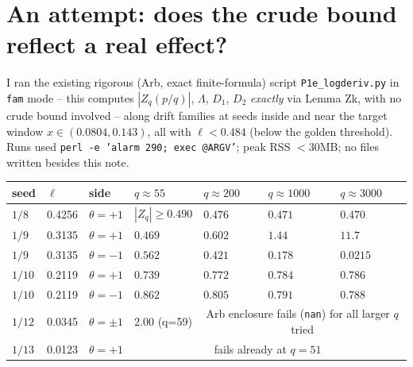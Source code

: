 \documentclass[11pt]{article}
\theoremstyle{remark}\newtheorem{remark}[theorem]{Remark}
\begin{document}
\section{An attempt: does the crude bound reflect a real effect?}\label{sec:attempt}
I ran the existing rigorous (Arb, exact finite-formula) script \texttt{P1e\_logderiv.py} in \texttt{fam} mode -- this computes $|Z_q(p/q)|$, $\Lambda$, $D_1$, $D_2$ \emph{exactly} via Lemma Zk, with no crude bound involved -- along drift families at seeds inside and near the target window $x\in(0.0804,0.143)$, all with $\ell<0.484$ (below the golden threshold). Runs used \texttt{perl -e 'alarm 290; exec @ARGV'}; peak RSS $<30$MB; no files written besides this note.

\begin{center}\small\begin{tabular}{lllllll}\toprule
seed & $\ell$ & side & $q\approx55$ & $q\approx200$ & $q\approx1000$ & $q\approx3000$\\\midrule
$1/8$ & 0.4256 & $\theta=+1$ & $|Z_q|\ge0.490$ & $0.476$ & $0.471$ & $0.470$\\
$1/9$ & 0.3135 & $\theta=+1$ & $0.469$ & $0.602$ & $1.44$ & $11.7$\\
$1/9$ & 0.3135 & $\theta=-1$ & $0.562$ & $0.421$ & $0.178$ & $0.0215$\\
$1/10$ & 0.2119 & $\theta=+1$ & $0.739$ & $0.772$ & $0.784$ & $0.786$\\
$1/10$ & 0.2119 & $\theta=-1$ & $0.862$ & $0.805$ & $0.791$ & $0.788$\\
$1/12$ & 0.0345 & $\theta=\pm1$ & $2.00$ (q=59) & \multicolumn{3}{c}{Arb enclosure fails (\texttt{nan}) for all larger $q$ tried}\\
$1/13$ & 0.0123 & $\theta=+1$ & \multicolumn{4}{c}{fails already at $q=51$}\\\bottomrule
\end{tabular}\end{center}
\end{document}
